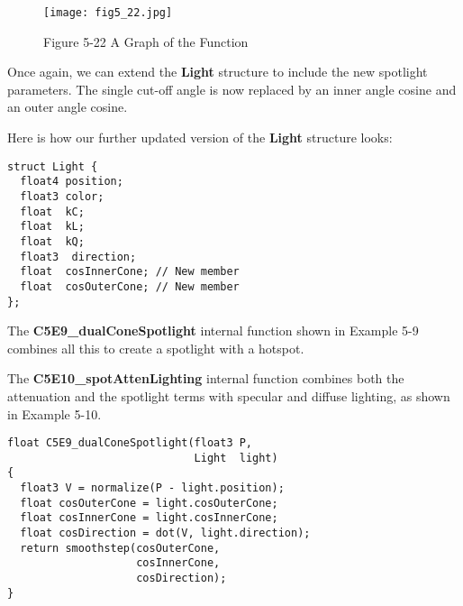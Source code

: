\documentclass[../main.tex]{subfiles}
\begin{document}
\begin{figure}
    \centering
    \texttt{[image: fig5\_22.jpg]}
    \caption{Figure 5-22 A Graph of the Function}
    \label{fig:5-22}
\end{figure}

Once again, we can extend the \textbf{Light} structure to include the new spotlight parameters. The single cut-off angle is now replaced by an inner angle cosine and an outer angle cosine.

Here is how our further updated version of the \textbf{Light} structure looks:

\FloatBarrier
\begin{lstlisting}
struct Light {
  float4 position;
  float3 color;
  float  kC;
  float  kL;
  float  kQ;
  float3  direction;
  float  cosInnerCone; // New member
  float  cosOuterCone; // New member
};
\end{lstlisting}
\FloatBarrier

The \textbf{C5E9_dualConeSpotlight} internal function shown in Example 5-9 combines all this to create a spotlight with a hotspot.

The \textbf{C5E10_spotAttenLighting} internal function combines both the attenuation and the spotlight terms with specular and diffuse lighting, as shown in Example 5-10.

\FloatBarrier
\begin{lstlisting}[caption=Example 5-9. The \textbf{C5E9_dualConeSpotlight} Internal Function]
float C5E9_dualConeSpotlight(float3 P,
                             Light  light)
{
  float3 V = normalize(P - light.position);
  float cosOuterCone = light.cosOuterCone;
  float cosInnerCone = light.cosInnerCone;
  float cosDirection = dot(V, light.direction);
  return smoothstep(cosOuterCone,
                    cosInnerCone,
                    cosDirection);
}
\end{lstlisting}
\FloatBarrier
\end{document}
